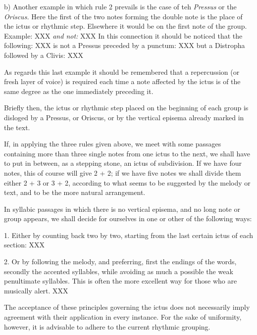 b) Another example in which rule 2 prevails is the case of teh {\it Pressus} or the {\it Oriscus.} Here the first of the two notes forming the double note is the place of the ictus or rhythmic step. Elsewhere it would be on the first note of the group.
Example: XXX
{\it and not:}
XXX
In this connection it should be noticed that the following: XXX is not a Pressus preceded by a punctum: XXX but a Distropha followed by a Clivis: XXX

As regards this last example it should be remembered that a repercussion (or fresh layer of voice) is required each time a note affected by the ictus is of the same degree as the one immediately preceding it.

Briefly then, the ictus or rhythmic step placed on the beginning of each group is disloged by a Pressus, or Oriscus, or by the vertical episema already marked in the text.

If, in applying the three rules given above, we meet with some passages containing more than three single notes from one ictus to the next, we shall have to put in between, as a stepping stone, an ictus of subdivision. If we have four notes, this of course will give 2 + 2; if we have five notes we shall divide them either 2 + 3 or 3 + 2, according to what seems to be suggested by the melody or text, and to be the more natural arrangement.

In syllabic passages in which there is no vertical episema, and no long note or group appears, we shall decide for ourselves in one or other of the following ways:

1. Either by counting back two by two, starting from the last certain ictus of each section:
XXX

2. Or by following the melody, and preferring, first the endings of the words, secondly the accented syllables, while avoiding as much a possible the weak penultimate syllables. This is often the more excellent way for those who are musically alert.
XXX

The acceptance of these principles governing the ictus does not necessarily imply agreement with their application in every instance. For the sake of uniformity, however, it is advisable to adhere to the current rhythmic grouping.

